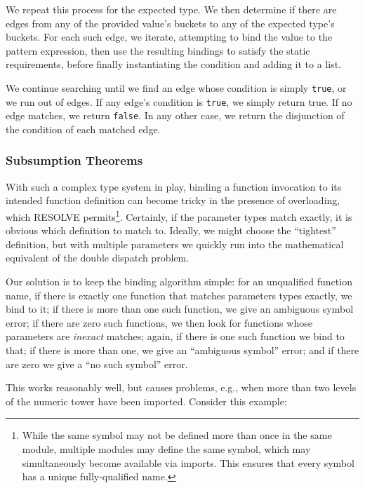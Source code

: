 We repeat this process for the expected type.  We then determine if there are edges from any of the provided value's buckets to any of the expected type's buckets.  For each such edge, we iterate, attempting to bind the value to the pattern expression, then use the resulting bindings to satisfy the static requirements, before finally instantiating the condition and adding it to a list.

We continue searching until we find an edge whose condition is simply \texttt{true}, or we run out of edges.  If any edge's condition is \texttt{true}, we simply return true.  If no edge matches, we return \texttt{false}.  In any other case, we return the disjunction of the condition of each matched edge.

		\subsubsection{Subsumption Theorems\label{subsumptionTheorems}}

With such a complex type system in play, binding a function invocation to its intended function definition can become tricky in the presence of overloading, which RESOLVE permits\footnote{While the same symbol may not be defined more than once in the same module, multiple modules may define the same symbol, which may simultaneously become available via imports.  This ensures that every symbol has a unique fully-qualified name.}.  Certainly, if the parameter types match exactly, it is obvious which definition to match to.  Ideally, we might choose the ``tightest'' definition, but with multiple parameters we quickly run into the mathematical equivalent of the double dispatch problem.

Our solution is to keep the binding algorithm simple: for an unqualified function name, if there is exactly one function that matches parameters types exactly, we bind to it; if there is more than one such function, we give an ambiguous symbol error; if there are zero such functions, we then look for functions whose parameters are \emph{inexact} matches; again, if there is one such function we bind to that; if there is more than one, we give an ``ambiguous symbol'' error; and if there are zero we give a ``no such symbol'' error.

This works reasonably well, but causes problems, e.g., when more than two levels of the numeric tower have been imported.  Consider this example:

